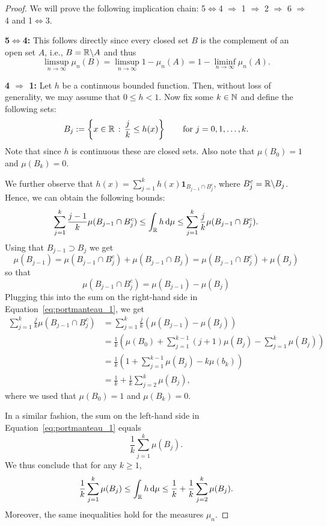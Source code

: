 \begin{proof}
We will prove the following implication chain: 5$\iff$4 $\Rightarrow$ 1 $\Rightarrow$ 2 $\Rightarrow$ 6 $\Rightarrow$ 4 and 1$\iff$3. 

\textbf{5$\iff$4:} This follows directly since every closed set $B$ is the complement of an open set $A$, i.e., $B = \mathbb R\backslash A$ and thus
\[
	\limsup_{n \to \infty} \mu_n(B) = \limsup_{n \to \infty} 1 - \mu_n(A) = 1 - \liminf_{n \to \infty} \mu_n(A).
\]

\textbf{4 $\Rightarrow$ 1:} Let $h$ be a continuous bounded function. Then, without loss of generality, we may assume that $0 \le h < 1$. Now fix some $k \in \mathbb N$ and define the following sets:
\[
	B_j := \left\{x \in \mathbb R \, : \, \frac{j}{k} \le h(x)\right\} \qquad \text{for } j = 0, 1, \dots, k.
\]
Note that since $h$ is continuous these are closed sets. Also note that $\mu(B_0) = 1$ and $\mu(B_k) = 0$.

We further observe that $h(x) = \sum_{j = 1}^k h(x) \mathbf{1}_{B_{j-1} \cap B_j^c}$, where $B_j^c = \mathbb R \backslash B_j$. Hence, we can obtain the following bounds:
\begin{equation}\label{eq:portmanteau_1}
	\sum_{j = 1}^k \frac{j-1}{k} \mu(B_{j - 1} \cap B_j^c) \le \int_{\mathbb R} h \, \mathrm{d} \mu \le \sum_{j = 1}^k \frac{j}{k} \mu(B_{j - 1} \cap B_j^c).
\end{equation}
Using that $B_{j-1} \supset B_{j}$ we get
\[
	\mu(B_{j - 1}) = \mu(B_{j-1} \cap B_j^c) + \mu(B_{j-1} \cap B_j) = \mu(B_{j-1} \cap B_j^c) + \mu(B_j)
\]
so that
\[
	\mu(B_{j-1} \cap B_j^c) = \mu(B_{j-1}) - \mu(B_j)
\]
Plugging this into the sum on the right-hand side in Equation~\eqref{eq:portmanteau_1}, we get
\begin{align*}
	\sum_{j = 1}^k \frac{j}{k} \mu(B_{j - 1} \cap B_j^c) &= \sum_{j = 1}^k \frac{j}{k} (\mu(B_{j-1}) - \mu(B_j))\\
	&= \frac{1}{k} \left(\mu(B_0) + \sum_{j = 1}^{k-1} (j+1) \mu(B_j) - \sum_{j = 1}^k \mu(B_j)\right) \\
	&= \frac{1}{k} \left(1 + \sum_{j = 1}^{k-1} \mu(B_j) - k \mu(b_k)\right)\\
	&= \frac{1}{k} + \frac{1}{k} \sum_{j = 2}^{k} \mu(B_j),
\end{align*}
where we used that $\mu(B_0) = 1$ and $\mu(B_k) = 0$.

In a similar fashion, the sum on the left-hand side in Equation~\eqref{eq:portmanteau_1} equals
\[
	\frac{1}{k} \sum_{j = 1}^k \mu(B_j).
\]
We thus conclude that for any $k \ge 1$,
\begin{equation}
	\frac{1}{k} \sum_{j = 1}^k \mu(B_j) \le \int_{\mathbb R} h \, \mathrm{d} \mu \le
	\frac{1}{k} + \frac{1}{k} \sum_{j = 2}^{k} \mu(B_j).
\end{equation}
Moreover, the same inequalities hold for the measures $\mu_n$.


\end{proof}

